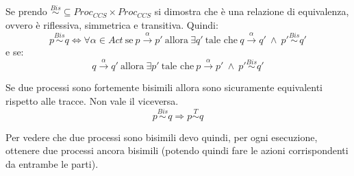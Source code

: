 \begin{teorema}
    Se prendo $\stackrel{Bis}{\sim}  \subseteq Proc_{CCS} \times Proc_{CCS}$ si
    dimostra che è una relazione di equivalenza, ovvero è riflessiva, simmetrica
    e transitiva. Quindi:
    \begin{equation}
        p \stackrel{Bis}{\sim} q \Longleftrightarrow \forall \alpha \in Act \
        \text{se} \ p \xrightarrow{\alpha} p'
        \ \text{allora} \
        \exists q' \ \text{tale che} \ q \xrightarrow{\alpha} q' \ \land \ p'
        \stackrel{Bis}{\sim} q'
    \end{equation}
    e se:
    \begin{equation}
        q \xrightarrow{\alpha} q' \ \text{allora} \
        \exists p' \ \text{tale che} \ p \xrightarrow{\alpha} p' \ \land \ p'
        \stackrel{Bis}{\sim} q'
    \end{equation}
\end{teorema}
\begin{teorema}
    Se due processi sono fortemente bisimili allora sono sicuramente equivalenti
    rispetto alle tracce. Non vale il viceversa.
    \begin{equation}
        p \stackrel{Bis}{\sim} q \Rightarrow p \stackrel{T}{\sim} q
    \end{equation}
\end{teorema}
\begin{osservazione}
    Per vedere che due processi sono bisimili devo quindi, per ogni esecuzione,
    ottenere due processi ancora bisimili (potendo quindi fare le azioni
    corrispondenti da entrambe le parti).
\end{osservazione}
